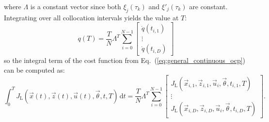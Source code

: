 \documentclass[a4paper,12pt]{article}
\newcommand{\myl}{\xi}
\newcommand{\myldot}{\myl'}
\newcommand{\matr}[2]{\left[\begin{array}{#1}#2\end{array}\right]}
\newcommand{\refeq}[1]{Eq.~(\ref{#1})}
\begin{document}
%
where $\Lambda$ is a constant vector since both $\myl_j(\tau_k)$ and $\myldot_j(\tau_k)$ are constant.
Integrating over all collocation intervals yields the value at $T$:
\begin{equation}
q(T) = \frac{T}{N}\Lambda^T
\sum_{i=0}^{N-1}
\matr{c}{
\dot{q}(t_{i,1}) \\
\vdots   \\
\dot{q}(t_{i,D})}
\end{equation}
%
so the integral term of the cost function from \refeq{eq:general_continuous_ocp} can be computed as:
\begin{equation}
\int_0^T \! J_\mathrm{L}(\vec{x}(t),\vec{z}(t),\vec{u}(t),\vec{\theta},t,T) \, \mathrm{d}t =
\frac{T}{N}\Lambda^T
\sum_{i=0}^{N-1}
\matr{c}{
J_\mathrm{L}(\vec{x}_{i,1},\vec{z}_{i,1},\vec{u}_i,\vec{\theta},t_{i,1},T) \\
\vdots   \\
J_\mathrm{L}(\vec{x}_{i,D},\vec{z}_{i,D},\vec{u}_i,\vec{\theta},t_{i,D},T)}.
\end{equation}
\end{document}
